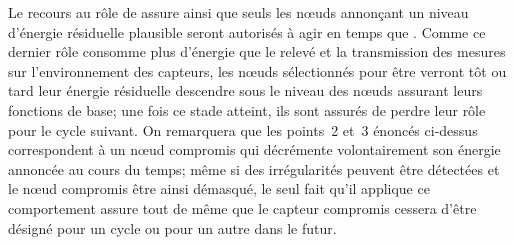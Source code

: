 Le recours au rôle de \vn assure ainsi que seuls les nœuds annonçant un niveau d'énergie résiduelle plausible seront autorisés à agir en temps que \cns.
Comme ce dernier rôle consomme plus d'énergie que le relevé et la transmission des mesures sur l'environnement des capteurs, les nœuds sélectionnés pour être \cns verront tôt ou tard leur énergie résiduelle descendre sous le niveau des nœuds assurant leurs fonctions de base; une fois ce stade atteint, ils sont assurés de perdre leur rôle pour le cycle suivant.
On remarquera que les points~2 et~3 énoncés ci-dessus correspondent à un nœud compromis qui décrémente volontairement son énergie annoncée au cours du temps; même si des irrégularités peuvent être détectées et le nœud compromis être ainsi démasqué, le seul fait qu'il applique ce comportement assure tout de même que le capteur compromis cessera d'être désigné \cn pour un cycle ou pour un autre dans le futur.

